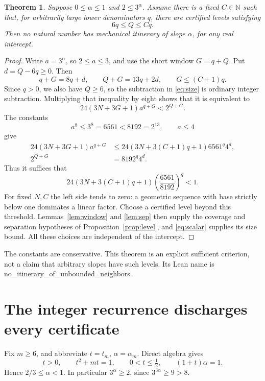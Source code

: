 \documentclass[11pt]{article}
\newtheorem{theorem}{Theorem}[section]
\theoremstyle{remark}
\newcommand{\N}{\mathbb N}
\newcommand{\code}[1]{{\small\ttfamily #1}}
\begin{document}
\begin{theorem}\label{thm:criterion}
Suppose $0\le\alpha\le1$ and $2\le3^\alpha$. Assume there is a fixed
$C\in\N$ such that, for arbitrarily large lower denominators $q$,
there are certified levels satisfying
\begin{equation}\label{eq:ratio}
6q\le Q\le Cq.
\end{equation}
Then no natural number has mechanical itinerary of slope $\alpha$,
for any real intercept.
\end{theorem}
\begin{proof}
Write $a=3^\alpha$, so $2\le a\le3$, and use the short window $G=q+Q$.
Put $d=Q-6q\ge0$. Then
\begin{equation}\label{eq:exponents}
q+G=8q+d,\qquad Q+G=13q+2d,\qquad G\le(C+1)q.
\end{equation}
Since $q>0$, we also have $Q\ge6$, so the subtraction in
\eqref{eq:size} is ordinary integer subtraction. Multiplying that
inequality by eight shows that it is equivalent to
\begin{equation}\label{eq:size24}
24(3N+3G+1)a^{q+G}<2^{Q+G}.
\end{equation}
The constants
\[
a^8\le3^8=6561<8192=2^{13},\qquad a\le4
\]
give
\begin{align*}
24(3N+3G+1)a^{q+G}
&\le24(3N+3(C+1)q+1)6561^q4^d,\\
2^{Q+G}&=8192^q4^d.
\end{align*}
Thus it suffices that
\begin{equation}\label{eq:scalar}
24(3N+3(C+1)q+1)\left(\frac{6561}{8192}\right)^q<1.
\end{equation}
For fixed $N,C$ the left side tends to zero: a geometric sequence with
base strictly below one dominates a linear factor. Choose a certified
level beyond this threshold. Lemmas~\ref{lem:window} and \ref{lem:sep}
then supply the coverage and separation hypotheses of
Proposition~\ref{prop:level}, and \eqref{eq:scalar} supplies its size bound.
All these choices are independent of the intercept.
\end{proof}
The constants are conservative. This theorem is an explicit sufficient
criterion, not a claim that arbitrary slopes have such levels. Its Lean
name is \code{no\_\allowbreak{}itinerary\_\allowbreak{}of\_\allowbreak{}unbounded\_\allowbreak{}neighbors}.

\section{The integer recurrence discharges every certificate}
Fix $m\ge6$, and abbreviate $t=t_m$, $\alpha=\alpha_m$. Direct algebra gives
\begin{equation}\label{eq:root}
t>0,\qquad t^2+mt=1,\qquad 0<t\le\tfrac12,
\qquad (1+t)\alpha=1.
\end{equation}
Hence $2/3\le\alpha<1$. In particular $3^\alpha\ge2$, since
$3^{3\alpha}\ge9>8$.
\end{document}
